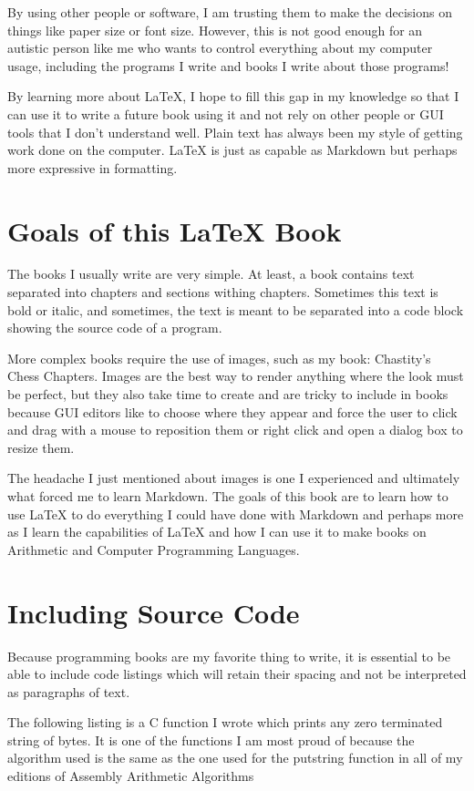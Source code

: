 \documentclass{book}
\begin{document}
By using other people or software, I am trusting them to make the decisions on things like paper size or font size. However, this is not good enough for an autistic person like me who wants to control everything about my computer usage, including the programs I write and books I write about those programs!

By learning more about LaTeX, I hope to fill this gap in my knowledge so that I can use it to write a future book using it and not rely on other people or GUI tools that I don't understand well. Plain text has always been my style of getting work done on the computer. LaTeX is just as capable as Markdown but perhaps more expressive in formatting.

\chapter{Goals of this LaTeX Book}

The books I usually write are very simple. At least, a book contains text separated into chapters and sections withing chapters. Sometimes this text is bold or italic, and sometimes, the text is meant to be separated into a code block showing the source code of a program.

More complex books require the use of images, such as my book: Chastity's Chess Chapters. Images are the best way to render anything where the look must be perfect, but they also take time to create and are tricky to include in books because GUI editors like to choose where they appear and force the user to click and drag with a mouse to reposition them or right click and open a dialog box to resize them.

The headache I just mentioned about images is one I experienced and ultimately what forced me to learn Markdown. The goals of this book are to learn how to use LaTeX to do everything I could have done with Markdown and perhaps more as I learn the capabilities of LaTeX and how I can use it to make books on Arithmetic and Computer Programming Languages.

\chapter{Including Source Code}

Because programming books are my favorite thing to write, it is essential to be able to include
code listings which will retain their spacing and not be interpreted as paragraphs of text.

The following listing is a C function I wrote which prints any zero terminated string of bytes. It is one of the functions I am most proud of because the algorithm used is the same as the one used for the putstring function in all of my editions of Assembly Arithmetic Algorithms
\end{document}

